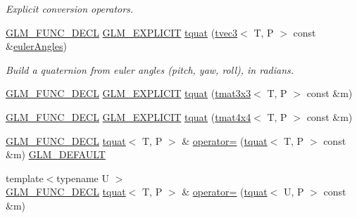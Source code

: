 \begin{DoxyCompactItemize}
\begin{DoxyCompactList}\small\item\em Explicit conversion operators. \end{DoxyCompactList}\item 
\mbox{\hyperlink{setup_8hpp_ab2d052de21a70539923e9bcbf6e83a51}{G\+L\+M\+\_\+\+F\+U\+N\+C\+\_\+\+D\+E\+CL}} \mbox{\hyperlink{setup_8hpp_a6c74f5a5e7b134ab69023ff9a30d4d5d}{G\+L\+M\+\_\+\+E\+X\+P\+L\+I\+C\+IT}} \mbox{\hyperlink{structglm_1_1tquat_a9841cfe16ccfb909c4c2cd0956f2d42b}{tquat}} (\mbox{\hyperlink{structglm_1_1tvec3}{tvec3}}$<$ T, P $>$ const \&\mbox{\hyperlink{group__gtc__quaternion_gadb92ec1c1b0dd6b024176a73fbef3e64}{euler\+Angles}})
\begin{DoxyCompactList}\small\item\em Build a quaternion from euler angles (pitch, yaw, roll), in radians. \end{DoxyCompactList}\item 
\mbox{\hyperlink{setup_8hpp_ab2d052de21a70539923e9bcbf6e83a51}{G\+L\+M\+\_\+\+F\+U\+N\+C\+\_\+\+D\+E\+CL}} \mbox{\hyperlink{setup_8hpp_a6c74f5a5e7b134ab69023ff9a30d4d5d}{G\+L\+M\+\_\+\+E\+X\+P\+L\+I\+C\+IT}} \mbox{\hyperlink{structglm_1_1tquat_a56ea9f0ac327fc40f99821fd8e0816f8}{tquat}} (\mbox{\hyperlink{structglm_1_1tmat3x3}{tmat3x3}}$<$ T, P $>$ const \&m)
\item 
\mbox{\hyperlink{setup_8hpp_ab2d052de21a70539923e9bcbf6e83a51}{G\+L\+M\+\_\+\+F\+U\+N\+C\+\_\+\+D\+E\+CL}} \mbox{\hyperlink{setup_8hpp_a6c74f5a5e7b134ab69023ff9a30d4d5d}{G\+L\+M\+\_\+\+E\+X\+P\+L\+I\+C\+IT}} \mbox{\hyperlink{structglm_1_1tquat_a738e6d5bcc5a75cca8ac119edafaeafa}{tquat}} (\mbox{\hyperlink{structglm_1_1tmat4x4}{tmat4x4}}$<$ T, P $>$ const \&m)
\item 
\mbox{\hyperlink{setup_8hpp_ab2d052de21a70539923e9bcbf6e83a51}{G\+L\+M\+\_\+\+F\+U\+N\+C\+\_\+\+D\+E\+CL}} \mbox{\hyperlink{structglm_1_1tquat}{tquat}}$<$ T, P $>$ \& \mbox{\hyperlink{structglm_1_1tquat_a19b252f704a5d0cb43df15cd3a8b545e}{operator=}} (\mbox{\hyperlink{structglm_1_1tquat}{tquat}}$<$ T, P $>$ const \&m) \mbox{\hyperlink{setup_8hpp_aefce7051c376a64ba89fa93a9f63bc2c}{G\+L\+M\+\_\+\+D\+E\+F\+A\+U\+LT}}
\item 
{\footnotesize template$<$typename U $>$ }\\\mbox{\hyperlink{setup_8hpp_ab2d052de21a70539923e9bcbf6e83a51}{G\+L\+M\+\_\+\+F\+U\+N\+C\+\_\+\+D\+E\+CL}} \mbox{\hyperlink{structglm_1_1tquat}{tquat}}$<$ T, P $>$ \& \mbox{\hyperlink{structglm_1_1tquat_af00985afe704157487281c4c3eb4f790}{operator=}} (\mbox{\hyperlink{structglm_1_1tquat}{tquat}}$<$ U, P $>$ const \&m)

\end{DoxyCompactItemize}
